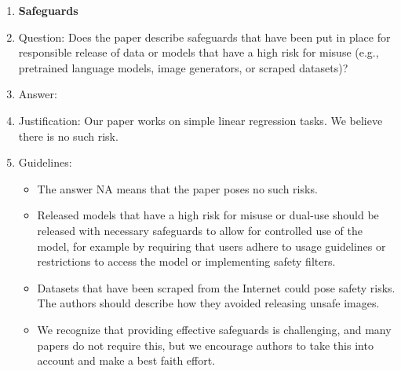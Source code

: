 \documentclass[11pt]{article}
\theoremstyle{plain}
\theoremstyle{definition}
\theoremstyle{remark}
\renewcommand{\^}[1]{^{(#1)}}
\begin{document}
\begin{enumerate}
\item {\bf Safeguards}
    \item[] Question: Does the paper describe safeguards that have been put in place for responsible release of data or models that have a high risk for misuse (e.g., pretrained language models, image generators, or scraped datasets)?
    \item[] Answer: \answerNA{} 
    \item[] Justification: Our paper works on simple linear regression tasks. We believe there is no such risk.
    \item[] Guidelines:
    \begin{itemize}
        \item The answer NA means that the paper poses no such risks.
        \item Released models that have a high risk for misuse or dual-use should be released with necessary safeguards to allow for controlled use of the model, for example by requiring that users adhere to usage guidelines or restrictions to access the model or implementing safety filters. 
        \item Datasets that have been scraped from the Internet could pose safety risks. The authors should describe how they avoided releasing unsafe images.
        \item We recognize that providing effective safeguards is challenging, and many papers do not require this, but we encourage authors to take this into account and make a best faith effort.
    \end{itemize}


\end{enumerate}
\end{document}
